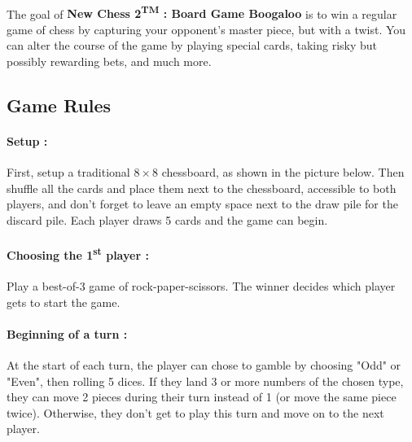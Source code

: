 \documentclass[12pt]{article}
\begin{document}
            \paragraph{}
                The goal of \textbf{New Chess 2\textsuperscript{TM} : Board Game Boogaloo} is to win a regular game of chess by capturing your opponent's master piece, but with a twist. You can alter the course of the game by playing special cards, taking risky but possibly rewarding bets, and much more.
                
        \subsection{Game Rules}
            \paragraph{Setup :\\}
                First, setup a traditional $8\times8$ chessboard, as shown in the picture below. Then shuffle all the cards and place them next to the chessboard, accessible to both players, and don't forget to leave an empty space next to the draw pile for the discard pile. Each player draws 5 cards and the game can begin.
                \begin{figure}[H]
                        \centering
                        \newgame
                        \showboard
                \end{figure}
                
            \paragraph{Choosing the 1\textsuperscript{st} player :\\}
                Play a best-of-3 game of rock-paper-scissors. The winner decides which player gets to start the game.
                
            \paragraph{Beginning of a turn :\\}
                At the start of each turn, the player can chose to gamble by choosing "Odd" or "Even", then rolling 5 dices. If they land 3 or more numbers of the chosen type, they can move 2 pieces during their turn instead of 1 (or move the same piece twice). Otherwise, they don't get to play this turn and move on to the next player.
                
\end{document}
